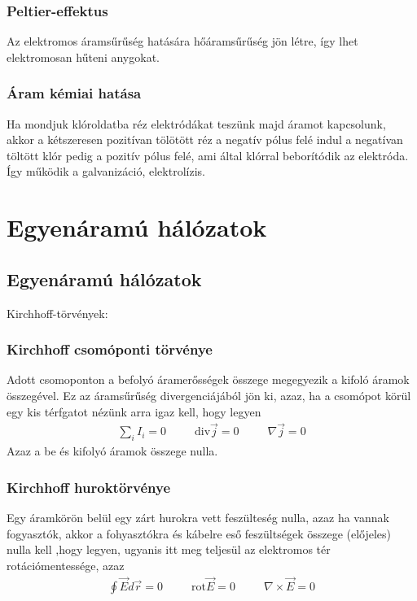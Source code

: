 \documentclass{article}
\begin{document}
\subsubsection{Peltier-effektus}
Az elektromos áramsűrűség hatására hőáramsűrűség jön létre, így lhet elektromosan hűteni anygokat.
\subsubsection{Áram kémiai hatása}
Ha mondjuk klóroldatba réz elektródákat teszünk majd áramot kapcsolunk, akkor a kétszeresen pozitívan tölötött réz a negatív pólus felé indul a negatívan töltött klór pedig a pozitív pólus felé, ami által klórral beborítódik az elektróda. Így működik a galvanizáció, elektrolízis.

\newpage
\section{Egyenáramú hálózatok}
\subsection{Egyenáramú hálózatok}
Kirchhoff-törvények:
\subsubsection{Kirchhoff csomóponti törvénye}
Adott csomoponton a befolyó áramerősségek összege megegyezik a kifoló áramok összegével. Ez az áramsűrűség divergenciájából jön ki, azaz, ha a csomópot körül egy kis térfgatot nézünk arra igaz kell, hogy legyen 
\begin{gather*}
\sum_i I_i  = 0 \hspace{30pt}
\mathrm{div}\vec{j} = 0 \hspace{30pt} 
\nabla \vec{j} = 0
\end{gather*}
Azaz a be és kifolyó áramok összege nulla.
\subsubsection{Kirchhoff huroktörvénye}
Egy áramkörön belül egy zárt hurokra vett feszülteség nulla, azaz ha vannak fogyasztók, akkor a fohyasztókra és kábelre eső feszültségek összege (előjeles) nulla kell ,hogy legyen, ugyanis itt meg teljesül az elektromos tér rotációmentessége, azaz
\begin{gather*}
\oint \vec{E} d\vec{r} = 0  \hspace{30pt}
\mathrm{rot}\vec{E} = 0 \hspace{30pt}
\nabla \times \vec{E} = 0
\end{gather*}
\end{document}

